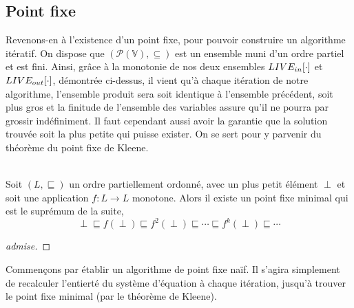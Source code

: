 \documentclass[a4paper, 11pt]{article}
\begin{document}
\subsection{Point fixe}
Revenons-en à l'existence d'un point fixe, pour pouvoir construire un algorithme itératif. On dispose que 
$(\mathcal{P}(\mathbb{V}), \subseteq)$ est un ensemble muni d'un ordre partiel et est fini.
Ainsi, grâce à la monotonie de nos deux ensembles $LIVE_{in}[\cdot]$ et $LIVE_{out}[\cdot]$, démontrée ci-dessus, il
vient qu'à chaque itération de notre algorithme, l'ensemble produit sera soit identique à l'ensemble précédent,
soit plus gros et la finitude de l'ensemble des variables assure qu'il ne pourra par grossir indéfiniment. 
Il faut cependant aussi avoir la garantie que la solution trouvée soit la plus petite qui puisse exister.
On se sert pour y parvenir du théorème du point fixe de Kleene.
\\
\\
\begin{theorem}
	Soit $(L, \sqsubseteq)$ un ordre partiellement ordonné, avec un plus petit élément  $\perp$ et soit
	une application $f : L \longrightarrow L$ monotone. Alors il existe un point fixe minimal qui est le suprémum de la suite,
	\[\perp \sqsubseteq f(\perp) \sqsubseteq f^2(\perp) \sqsubseteq \cdots \sqsubseteq f^k(\perp) \sqsubseteq \cdots\]
\end{theorem}
\begin{proof}
	[admise]
\end{proof}
Commençons par établir un algorithme de point fixe naïf. Il s'agira simplement de recalculer l'entierté du système
d'équation à chaque itération, jusqu'à trouver le point fixe minimal (par le théorème de Kleene).
\end{document}
